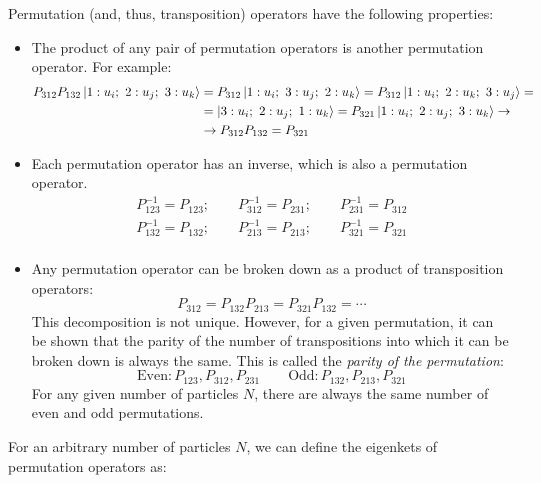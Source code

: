 Permutation (and, thus, transposition) operators have the following properties:
\begin{itemize}
    \item The product of any pair of permutation operators is another permutation operator. For example:
    \begin{equation}
        \begin{split}
            P_{312}P_{132}\ket{1:u_i;\ 2:u_j;\ 3:u_k} &= P_{312}\ket{1:u_i;\ 3:u_j;\ 2:u_k} = P_{312}\ket{1:u_i;\ 2:u_k;\ 3:u_j} = \\
            &= \ket{3:u_i;\ 2:u_j;\ 1:u_k} = P_{321}\ket{1:u_i;\ 2:u_j;\ 3:u_k} \rightarrow\\
            &\rightarrow P_{312}P_{132} = P_{321}
        \end{split}
    \end{equation}
    \item Each permutation operator has an inverse, which is also a permutation operator.
    \begin{equation}
        \begin{split}
            P_{123}^{-1} = P_{123}; \qquad P_{312}^{-1} = P_{231};\qquad P_{231}^{-1} = P_{312}\\
            P_{132}^{-1} = P_{132}; \qquad P_{213}^{-1} = P_{213};\qquad P_{321}^{-1} = P_{321}\\
        \end{split}
    \end{equation}
    \item Any permutation operator can be broken down as a product of transposition operators:
    \begin{equation}
        P_{312} = P_{132}P_{213} = P_{321}P_{132} = \cdots
    \end{equation}
    This decomposition is not unique. However, for a given permutation, it can be shown that the parity of the number of transpositions into which it can be broken down is always the same. This is called the \textit{parity of the permutation}:
    $$
    \text{Even}: P_{123}, P_{312}, P_{231}\qquad
    \text{Odd}: P_{132}, P_{213}, P_{321}
    $$
    For any given number of particles $N$, there are always the same number of even and odd permutations.
\end{itemize}

For an arbitrary number of particles $N$, we can define the eigenkets of permutation operators as:


